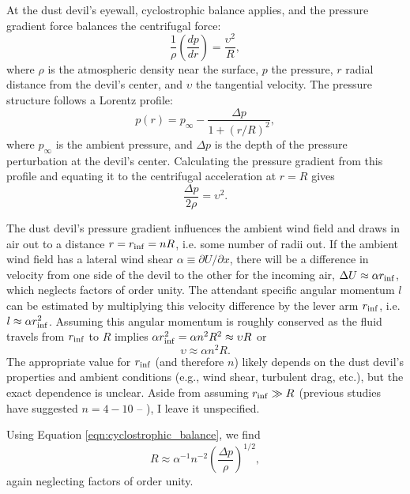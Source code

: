 \documentclass{aastex63}
\begin{document}
At the dust devil's eyewall, cyclostrophic balance applies, and the pressure gradient force balances the centrifugal force:
\begin{equation}
    \dfrac{1}{\rho}\left( \dfrac{dp}{dr} \right) = \dfrac{\upsilon^2}{R},
\end{equation}
where $\rho$ is the atmospheric density near the surface, $p$ the pressure, $r$ radial distance from the devil's center, and $\upsilon$ the tangential velocity. The pressure structure follows a Lorentz profile:
\begin{equation}
    p(r) = p_{\infty} - \dfrac{\Delta p}{1 + \left( r/R \right)^2},\label{eqn:pressure_profile}
\end{equation}
where $p_{\infty}$ is the ambient pressure, and $\Delta p$ is the depth of the pressure perturbation at the devil's center. Calculating the pressure gradient from this profile and equating it to the centrifugal acceleration at $r = R$ gives
\begin{equation}
    \dfrac{\Delta p}{2\rho} = \upsilon^2.\label{eqn:cyclostrophic_balance}
\end{equation}

The dust devil's pressure gradient influences the ambient wind field and draws in air out to a distance $r = r_{\rm inf} = n R$, i.e. some number of radii out. If the ambient wind field has a lateral wind shear $\alpha \equiv \partial U/\partial x$, there will be a difference in velocity from one side of the devil to the other for the incoming air, $\Delta U \approx \alpha r_{\rm inf}$, which neglects factors of order unity. The attendant specific angular momentum $l$ can be estimated by multiplying this velocity difference by the lever arm $r_{\rm inf}$, i.e. $l \approx \alpha r_{\rm inf}^2$. Assuming this angular momentum is roughly conserved as the fluid travels from $r_{\rm inf}$ to $R$ implies $\alpha r_{\rm inf}^2 = \alpha n^2 R^2 \approx \upsilon R$ or 
\begin{equation}
    \upsilon \approx \alpha n^2 R.
\end{equation}
The appropriate value for $r_{\rm inf}$ (and therefore $n$) likely depends on the dust devil's properties and ambient conditions (e.g., wind shear, turbulent drag, etc.), but the exact dependence is unclear. Aside from assuming $r_{\rm inf} \gg R$ (previous studies have suggested $n = 4-10$ -- \citealp{2001JAtS...58..927R}), I leave it unspecified.

Using Equation \ref{eqn:cyclostrophic_balance}, we find
\begin{equation}
    R \approx \alpha^{-1} n^{-2} \left( \dfrac{\Delta p}{\rho} \right)^{1/2},\label{eqn:R_vs_Delta-p}
\end{equation}
again neglecting factors of order unity. 
\end{document}
